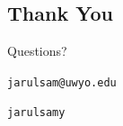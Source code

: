 \documentclass[13pt]{beamer}
\begin{document}
\subsection*{Thank You}
\begin{frame}{}
	\centering
	\Huge Questions?

	\vspace{0.3cm}
	\normalsize

	\faEnvelope\texttt{jarulsam@uwyo.edu}

	\faGithub\texttt{jarulsamy}
\end{frame}
\end{document}
